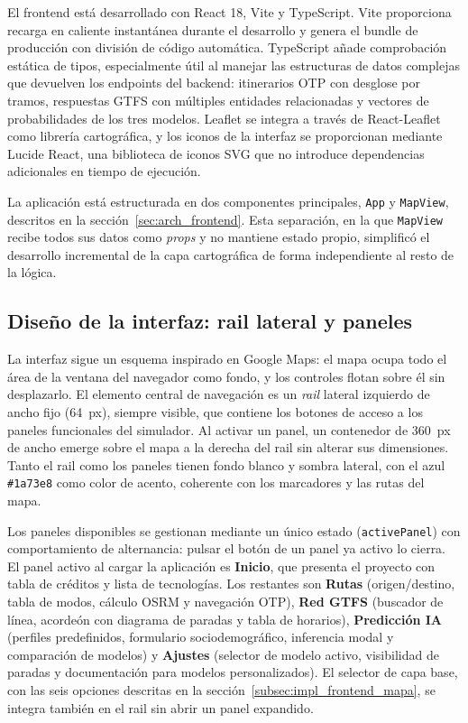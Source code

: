 El frontend está desarrollado con React 18, Vite y TypeScript. Vite proporciona recarga en caliente instantánea durante el desarrollo y genera el bundle de producción con división de código automática. TypeScript añade comprobación estática de tipos, especialmente útil al manejar las estructuras de datos complejas que devuelven los endpoints del backend: itinerarios OTP con desglose por tramos, respuestas GTFS con múltiples entidades relacionadas y vectores de probabilidades de los tres modelos. Leaflet se integra a través de React-Leaflet como librería cartográfica, y los iconos de la interfaz se proporcionan mediante Lucide React, una biblioteca de iconos SVG que no introduce dependencias adicionales en tiempo de ejecución.

La aplicación está estructurada en dos componentes principales, \texttt{App} y \texttt{MapView}, descritos en la sección~\ref{sec:arch_frontend}. Esta separación, en la que \texttt{MapView} recibe todos sus datos como \textit{props} y no mantiene estado propio, simplificó el desarrollo incremental de la capa cartográfica de forma independiente al resto de la lógica.

\subsection{Diseño de la interfaz: rail lateral y paneles}
\label{subsec:impl_frontend_ui}

La interfaz sigue un esquema inspirado en Google Maps: el mapa ocupa todo el área de la ventana del navegador como fondo, y los controles flotan sobre él sin desplazarlo. El elemento central de navegación es un \textit{rail} lateral izquierdo de ancho fijo (64~px), siempre visible, que contiene los botones de acceso a los paneles funcionales del simulador. Al activar un panel, un contenedor de 360~px de ancho emerge sobre el mapa a la derecha del rail sin alterar sus dimensiones. Tanto el rail como los paneles tienen fondo blanco y sombra lateral, con el azul \texttt{\#1a73e8} como color de acento, coherente con los marcadores y las rutas del mapa.

Los paneles disponibles se gestionan mediante un único estado (\texttt{activePanel}) con comportamiento de alternancia: pulsar el botón de un panel ya activo lo cierra. El panel activo al cargar la aplicación es \textbf{Inicio}, que presenta el proyecto con tabla de créditos y lista de tecnologías. Los restantes son \textbf{Rutas} (origen/destino, tabla de modos, cálculo OSRM y navegación OTP), \textbf{Red GTFS} (buscador de línea, acordeón con diagrama de paradas y tabla de horarios), \textbf{Predicción IA} (perfiles predefinidos, formulario sociodemográfico, inferencia modal y comparación de modelos) y \textbf{Ajustes} (selector de modelo activo, visibilidad de paradas y documentación para modelos personalizados). El selector de capa base, con las seis opciones descritas en la sección~\ref{subsec:impl_frontend_mapa}, se integra también en el rail sin abrir un panel expandido.


